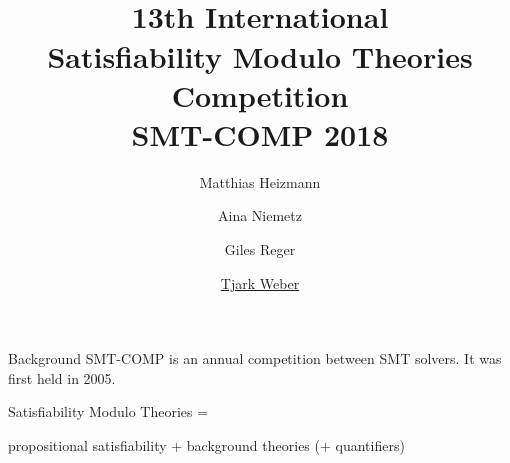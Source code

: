 \documentclass{beamer}
\title[SMT-COMP 2018]{${}$\\[3.5em]13th International\\
Satisfiability Modulo Theories\\
Competition\\[.7em]
SMT-COMP 2018\\[3em]}
\author{Matthias Heizmann \and Aina Niemetz\\ \and Giles Reger \and
  \underline{Tjark Weber}}
\institute{}
\date{}
\begin{document}

\frame{\titlepage}
\logo{}


\section{}%
\subsection{}%


\begin{frame}{Background}
  SMT-COMP is an annual competition between SMT solvers.  It was first
  held in 2005.

  \bigskip
  \bigskip

  \begin{center}
    Satisfiability Modulo Theories =

    \medskip
    
    propositional satisfiability + background theories (+ quantifiers)
  \end{center}
\end{frame}

\end{document}
